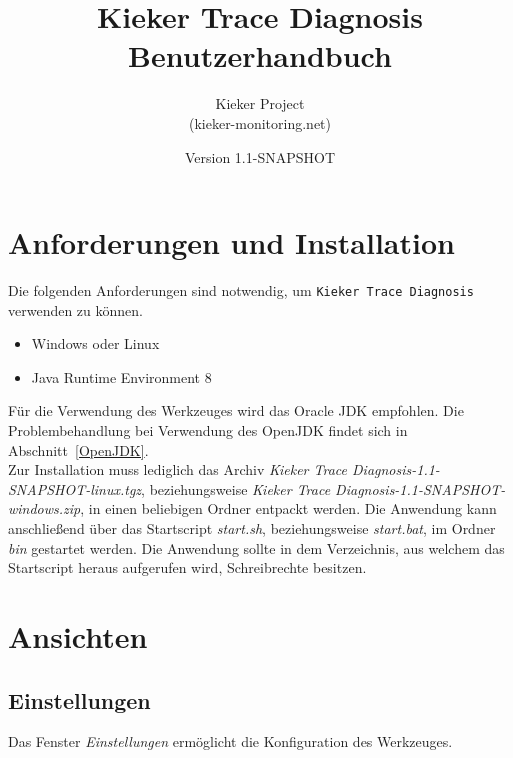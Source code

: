 \documentclass{article}
\begin{document}
  \newcommand{\version}[0]{1.1-SNAPSHOT}
  \newcommand{\KiekerTraceDiagnosis}[0]{\texttt{Kieker Trace Diagnosis}}
  \newcommand{\file}[1]{\textit{#1}}

  \title{Kieker Trace Diagnosis\\Benutzerhandbuch}
  \date{Version \version{}}
  \author{Kieker Project\\(kieker-monitoring.net)}

  \maketitle

  \section{Anforderungen und Installation}
  Die folgenden Anforderungen sind notwendig, um \KiekerTraceDiagnosis{} verwenden zu können.
  \begin{itemize}
    \item Windows oder Linux
    \item Java Runtime Environment 8
  \end{itemize}
  Für die Verwendung des Werkzeuges wird das Oracle JDK empfohlen. Die Problembehandlung bei Verwendung des OpenJDK findet sich in Abschnitt~\ref{OpenJDK}.\\

  Zur Installation muss lediglich das Archiv \file{Kieker Trace Diagnosis-\version{}-linux.tgz}, beziehungsweise \file{Kieker Trace Diagnosis-\version{}-windows.zip}, in einen beliebigen Ordner entpackt werden.
  Die Anwendung kann anschließend über das Startscript \file{start.sh}, beziehungsweise \file{start.bat}, im Ordner \file{bin} gestartet werden.
  Die Anwendung sollte in dem Verzeichnis, aus welchem das Startscript heraus aufgerufen wird, Schreibrechte besitzen.

  \section{Ansichten}

  \subsection{Einstellungen}

  Das Fenster \textit{Einstellungen} ermöglicht die Konfiguration des Werkzeuges.
\end{document}
